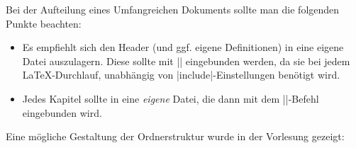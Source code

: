 % 


Bei der Aufteilung eines Umfangreichen Dokuments sollte man die folgenden Punkte beachten:
\begin{itemize}
	\item Es empfiehlt sich den Header (und ggf. eigene Definitionen) in eine eigene Datei auszulagern. Diese 
	sollte mit |\imput| eingebunden werden, da sie bei jedem \LaTeX-Durchlauf, unabhängig von 
	|include|-Einstellungen benötigt wird.
	\item Jedes Kapitel sollte in eine \emph{eigene} Datei, die dann mit dem ||-Befehl eingebunden wird.
\end{itemize}

Eine mögliche Gestaltung der Ordnerstruktur wurde in der Vorlesung gezeigt:

\begin{center}
\end{center}

\clearpage